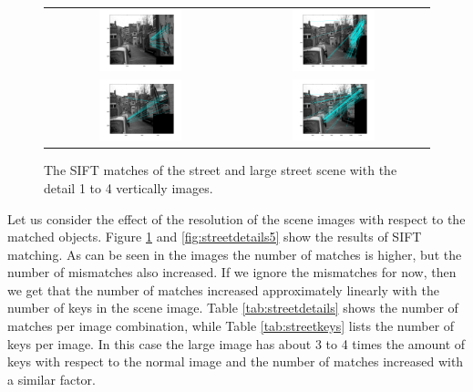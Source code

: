 \documentclass[11pt,a4paper]{article}
\begin{document}
\begin{figure}
\begin{tabular}{cc}
    \includegraphics[width=0.45\textwidth]{./img/street-d3-match.png} & \includegraphics[width=0.45\textwidth]{./img/streetlarge-d3-match.png} \\
    \includegraphics[width=0.45\textwidth]{./img/street-d4-match.png} & \includegraphics[width=0.45\textwidth]{./img/streetlarge-d4-match.png} \\
\end{tabular}
\caption{The SIFT matches of the street and large street scene with the detail 1 to 4 vertically images.}
\label{fig:streetdetails14}
\end{figure}

Let us consider the effect of the resolution of the scene images with respect to the matched objects.
Figure \ref{fig:streetdetails14} and \ref{fig:streetdetails5} show the results of SIFT matching.
As can be seen in the images the number of matches is higher, but the number of mismatches also increased.
If we ignore the mismatches for now, then we get that the number of matches increased approximately linearly with the number of keys in the scene image.
Table \ref{tab:streetdetails} shows the number of matches per image combination, while Table \ref{tab:streetkeys} lists the number of keys per image.
In this case the large image has about 3 to 4 times the amount of keys with respect to the normal image and the number of matches increased with a similar factor.
\end{document}
